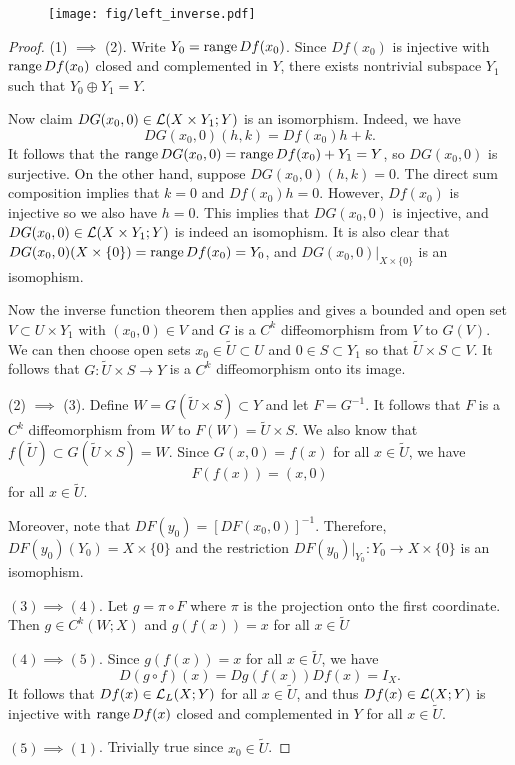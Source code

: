 \documentclass[a4paper]{article}
\begin{document}
\begin{figure}[!ht]
  \centering
  \texttt{[image: fig/left\_inverse.pdf]}
\end{figure}

\begin{proof}
(1) $\implies$ (2). Write $Y_0 = \operatorname{range} Df(x_0)$. 
Since $Df(x_0)$ is injective with $\operatorname{range} Df(x_0)$ closed 
and complemented in $Y$, there exists nontrivial subspace 
$Y_1$ such that $Y_0 \oplus Y_1 = Y$. 

Now claim $DG(x_0, 0) \in \mathcal{L}(X \times Y_1; Y)$ 
is an isomorphism. Indeed, we have 
\[
DG(x_0, 0) (h, k) = Df(x_0) h + k.
\]
It follows that the $\operatorname{range} DG(x_0, 0) = \operatorname{range} Df(x_0) + Y_1 
= Y$, so $DG(x_0, 0)$ is surjective. On the other hand, 
suppose $DG(x_0, 0)(h, k) = 0$. The direct sum composition
implies that $k = 0$ and $Df(x_0) h = 0$. However, $Df(x_0)$
is injective so we also have $h = 0$. This implies that
$DG(x_0, 0)$ is injective, and $DG(x_0, 0) \in \mathcal{L}(X \times 
Y_1; Y)$ is indeed an isomophism. 
It is also clear that $DG(x_0, 0) (X \times \{0\}) = \operatorname{range}
Df(x_0) = Y_0$, and $DG(x_0, 0) \vert_{X \times \{0\}}$
is an isomophism.

Now the inverse function theorem then applies and gives 
a bounded and open set $V \subset U \times Y_1$ with $
(x_0, 0) \in V$ and $G$ is a $C^k$ diffeomorphism from 
$V$ to $G(V)$. We can then choose open sets $x_0 \in \tilde{U}
\subset U$ and $0 \in S \subset Y_1$ so that $\tilde{U} \times
S \subset V$. It follows that $G : \tilde{U} \times S \to
Y$ is a $C^k$ diffeomorphism onto its image. 

(2) $\implies$ (3). Define $W = G(\tilde{U} \times S) 
\subset Y$ and let $F = G^{-1}$. It follows that 
$F$ is a $C^k$ diffeomorphism from $W$ to 
$F(W) = \tilde{U} \times S$.
We also know that $f(\tilde{U}) 
\subset G(\tilde{U} \times S) = W$. Since $G(x, 0) = f(x)$ 
for all $x \in \tilde{U}$, we have
\[
F(f(x)) = (x, 0)
\]
for all $x \in \tilde{U}$. 

Moreover, note that $DF(y_0) = [DF(x_0, 0)]^{-1}$. Therefore, 
$DF(y_0)(Y_0) = X \times \{0\}$ and the restriction 
$DF(y_0) \vert_{Y_0} : Y_0 \to X \times \{0\}$ is an 
isomophism.

$(3) \implies (4)$. Let $g = \pi \circ F$ where $\pi$
is the projection onto the first coordinate. Then 
$g \in C^k(W; X)$
and $g(f(x)) = x$ for all $x \in \tilde{U}$

$(4) \implies (5)$. Since $g(f(x)) = x$ for all $x \in 
\tilde{U}$, we have 
\[
D(g \circ f)(x) = Dg(f(x)) Df(x) = I_X.
\]
It follows that $Df(x) \in \mathcal{L}_L(X; Y)$ 
for all $x \in \tilde{U}$, 
and thus $Df(x) \in \mathcal{L}(X; Y)$ is injective with 
$\operatorname{range} Df(x)$ closed and complemented in $Y$ for all 
$x \in \tilde{U}$.

$(5) \implies (1)$. Trivially true since $x_0 \in \tilde{U}$.
\end{proof}
\end{document}
